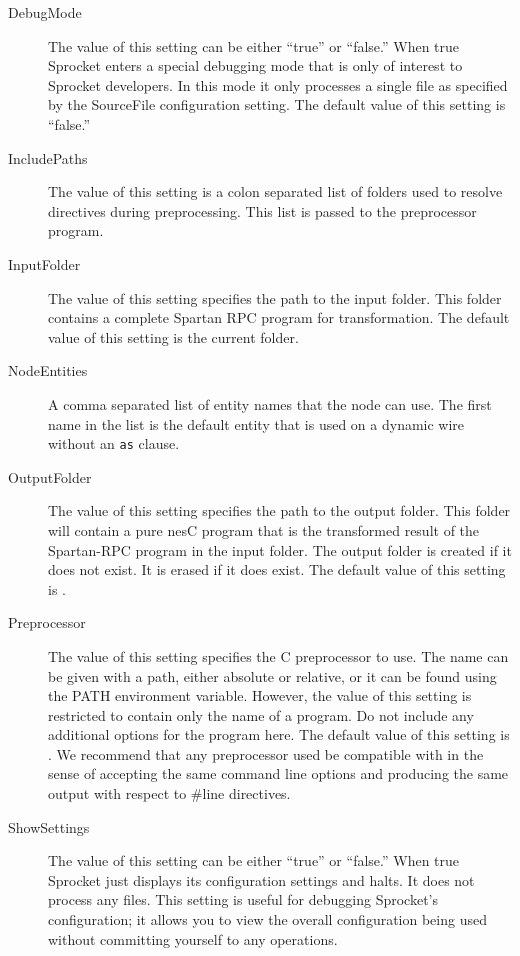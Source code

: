 \begin{description}

\item[DebugMode] The value of this setting can be either ``true'' or ``false.'' When true
  Sprocket enters a special debugging mode that is only of interest to Sprocket developers. In
  this mode it only processes a single file as specified by the SourceFile configuration
  setting. The default value of this setting is ``false.''

\item[IncludePaths] The value of this setting is a colon separated list of folders used to
  resolve  directives during preprocessing. This list is passed to the
  preprocessor program.

\item[InputFolder] The value of this setting specifies the path to the input folder. This folder
  contains a complete Spartan RPC program for transformation. The default value of this setting
  is the current folder.

\item[NodeEntities] A comma separated list of entity names that the node can use. The first name
  in the list is the default entity that is used on a dynamic wire without an \texttt{as}
  clause.

\item[OutputFolder] The value of this setting specifies the path to the output folder. This
  folder will contain a pure nesC program that is the transformed result of the Spartan-RPC
  program in the input folder. The output folder is created if it does not exist. It is erased
  if it does exist. The default value of this setting is .

\item[Preprocessor] The value of this setting specifies the C preprocessor to use. The name can
  be given with a path, either absolute or relative, or it can be found using the PATH
  environment variable. However, the value of this setting is restricted to contain only the
  name of a program. Do not include any additional options for the program here. The default
  value of this setting is . We recommend that any preprocessor used be compatible
  with  in the sense of accepting the same command line options and producing the
  same output with respect to \#line directives.

\item[ShowSettings] The value of this setting can be either ``true'' or ``false.'' When true
  Sprocket just displays its configuration settings and halts. It does not process any files.
  This setting is useful for debugging Sprocket's configuration; it allows you to view the
  overall configuration being used without committing yourself to any operations.


\end{description}
